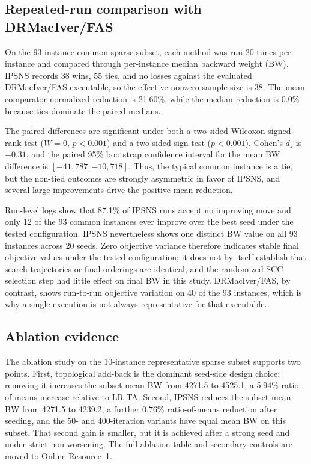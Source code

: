 \subsection{Repeated-run comparison with DRMacIver/FAS}
\label{subsec:exp10-results}

On the 93-instance common sparse subset, each method was run 20 times per instance and compared through per-instance median backward weight (BW). IPSNS records 38 wins, 55 ties, and no losses against the evaluated DRMacIver/FAS executable, so the effective nonzero sample size is 38. The mean comparator-normalized reduction is 21.60\%, while the median reduction is 0.0\% because ties dominate the paired medians.

The paired differences are significant under both a two-sided Wilcoxon signed-rank test (\(W=0\), \(p<0.001\)) and a two-sided sign test (\(p<0.001\)). Cohen's \(d_z\) is \(-0.31\), and the paired 95\% bootstrap confidence interval for the mean BW difference is \([-41{,}787,-10{,}718]\). Thus, the typical common instance is a tie, but the non-tied outcomes are strongly asymmetric in favor of IPSNS, and several large improvements drive the positive mean reduction.

Run-level logs show that 87.1\% of IPSNS runs accept no improving move and only 12 of the 93 common instances ever improve over the best seed under the tested configuration. IPSNS nevertheless shows one distinct BW value on all 93 instances across 20 seeds. Zero objective variance therefore indicates stable final objective values under the tested configuration; it does not by itself establish that search trajectories or final orderings are identical, and the randomized SCC-selection step had little effect on final BW in this study. DRMacIver/FAS, by contrast, shows run-to-run objective variation on 40 of the 93 instances, which is why a single execution is not always representative for that executable.

\subsection{Ablation evidence}

The ablation study on the 10-instance representative sparse subset supports two points. First, topological add-back is the dominant seed-side design choice: removing it increases the subset mean BW from 4271.5 to 4525.1, a 5.94\% ratio-of-means increase relative to LR-TA. Second, IPSNS reduces the subset mean BW from 4271.5 to 4239.2, a further 0.76\% ratio-of-means reduction after seeding, and the 50- and 400-iteration variants have equal mean BW on this subset. That second gain is smaller, but it is achieved after a strong seed and under strict non-worsening. The full ablation table and secondary controls are moved to Online Resource~1.

